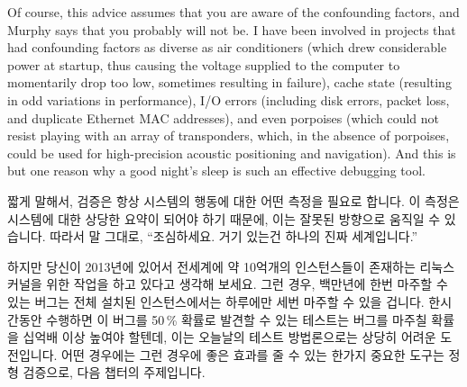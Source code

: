 Of course, this advice assumes that you are aware of the confounding
factors, and Murphy says that you probably will not be.
I have been involved in projects that had confounding factors as
diverse as air conditioners (which drew considerable power at startup,
thus causing the voltage supplied to the computer to momentarily drop
too low, sometimes resulting in failure), cache state (resulting in
odd variations in performance), I/O errors (including disk errors,
packet loss, and duplicate Ethernet MAC addresses), and even
porpoises (which could not resist playing with an array of transponders,
which, in the absence of porpoises, could be
used for high-precision acoustic positioning and navigation).
And this is but one reason why a good night's sleep is such an
effective debugging tool.
\fi

짧게 말해서, 검증은 항상 시스템의 행동에 대한 어떤 측정을 필요로 합니다.
이 측정은 시스템에 대한 상당한 요약이 되어야 하기 때문에, 이는 잘못된 방향으로
움직일 수 있습니다.
따라서 말 그대로, ``조심하세요.  거기 있는건 하나의 진짜 세계입니다.''

하지만 당신이 2013년에 있어서 전세계에 약 10억개의 인스턴스들이 존재하는 리눅스
커널을 위한 작업을 하고 있다고 생각해 보세요.
그런 경우, 백만년에 한번 마주할 수 있는 버그는 전체 설치된 인스턴스에서는
하루에만 세번 마주할 수 있을 겁니다.
한시간동안 수행하면 이 버그를 50\,\% 확률로 발견할 수 있는 테스트는 버그를
마주칠 확률을 십억배 이상 높여야 할텐데, 이는 오늘날의 테스트 방법론으로는
상당히 어려운 도전입니다.
어떤 경우에는 그런 경우에 좋은 효과를 줄 수 있는 한가지 중요한 도구는 정형
검증으로, 다음 챕터의 주제입니다.

